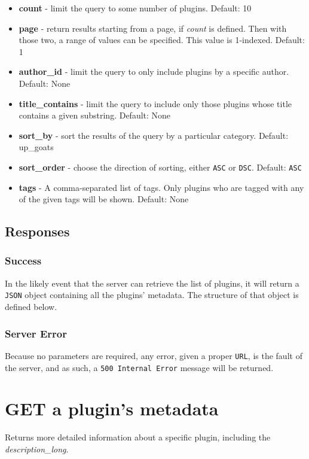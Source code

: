 \documentclass[a4paper, 12pt]{article}
\begin{document}
			\begin{itemize}
				\item \textbf{count} - limit the query to some number of plugins.
					\footnotesize{Default: 10}
				\item \textbf{page} - return results starting from a page, if \emph{count} is defined. Then with those two, a range of values can be specified. This value is 1-indexed.
					\footnotesize{Default: 1}
				\item \textbf{author\_id} - limit the query to only include plugins by a specific author.
					\footnotesize{Default: None}
				\item \textbf{title\_contains} - limit the query to include only those plugins whose title contains a given substring.
					\footnotesize{Default: None}
				\item \textbf{sort\_by} - sort the results of the query by a particular category.
					\footnotesize{Default: up\_goats}
				\item \textbf{sort\_order} - choose the direction of sorting, either \verb|ASC| or \verb|DSC|.
					\footnotesize{Default: \verb|ASC|}
				\item \textbf{tags} - A comma-separated list of tags. Only plugins who are tagged with any of the given tags will be shown.
					\footnotesize{Default: None}
			\end{itemize}

		\subsection{Responses}
			\subsubsection{Success}
				In the likely event that the server can retrieve the list of plugins, it will return a \verb|JSON| object containing all the plugins' metadata. The structure of that object is defined below.

				

			\subsubsection{Server Error}
				Because no parameters are required, any error, given a proper \verb|URL|, is the fault of the server, and as such, a \verb|500 Internal Error| message will be returned.

	\section{GET a plugin's metadata}
		Returns more detailed information about a specific plugin, including the \emph{description\_long}.
\end{document}
